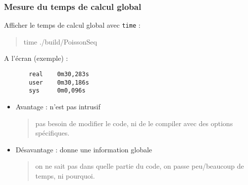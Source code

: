 \documentclass{beamer}
\begin{document}
\begin{frame}[fragile]
	\frametitle{Mesure du temps de calcul global}
    \vfill
	Afficher le temps de calcul global avec {\tt time} :
		\begin{quote}
	       time ./build/PoissonSeq
        \end{quote}
	
	A l'\'ecran (exemple) :\begin{minipage}[t]{4cm}
	\begin{verbatim}
	   real    0m30,283s
	   user    0m30,186s
	   sys     0m0,096s
	\end{verbatim}
	\end{minipage}

    \vfill
	\begin{itemize}
		\item Avantage : n'est pas intrusif
		\begin{quote}
			pas besoin de modifier le code, ni de le compiler avec des options sp\'ecifiques.
		\end{quote} 
		\item D\'esavantage : donne une information globale
		\begin{quote}
			on ne sait pas dans quelle partie du code, on passe peu/beaucoup de temps, ni pourquoi.
		\end{quote} 
	\end{itemize}
    \vfill
\end{frame}
\end{document}
